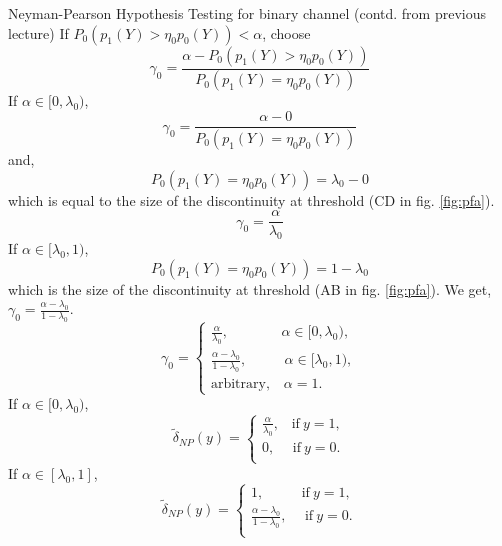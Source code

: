 \documentclass[a4paper,english,12pt]{article}
\begin{document}
\begin{exmp}{Neyman-Pearson Hypothesis Testing for binary channel (contd. from previous lecture)}
If ${P}_0(p_1(Y) > \eta_0 p_0(Y)) <\alpha$, choose  
\begin{equation}
\gamma_0 = \frac{\alpha-{P}_0(p_1(Y) > \eta_0 p_0(Y))}{{P}_0(p_1(Y) = \eta_0 p_0(Y))}
\end{equation}
If $\alpha \in [0,\lambda_0)$,
\begin{equation}
\gamma_0 = \frac{\alpha-0}{{P}_0(p_1(Y) = \eta_0 p_0(Y))}
\end{equation}
and,
\begin{equation}
{P}_0(p_1(Y) = \eta_0 p_0(Y)) = \lambda_0-0
\end{equation}
which is equal to the size of the discontinuity at threshold (CD in fig. \ref{fig:pfa}).
\begin{equation}
\gamma_0 = \frac{\alpha}{\lambda_0}
\end{equation}
If $\alpha \in [\lambda_0,1)$,
\begin{equation}
{P}_0(p_1(Y) = \eta_0 p_0(Y)) = 1-\lambda_0
\end{equation}
which is the size of the discontinuity at threshold (AB in fig. \ref{fig:pfa}). We get, $\gamma_0 = \frac{\alpha-\lambda_0}{1-\lambda_0}$.
\begin{equation}
\gamma_0=\begin{cases}
\frac{\alpha}{\lambda_0},\hspace{45pt}\alpha \in [0,\lambda_0),\\
\frac{\alpha-\lambda_0}{1-\lambda_0},\hspace{32pt}\alpha \in [\lambda_0,1),\\
\mbox{arbitrary},\hspace{10pt}\alpha = 1.
\end{cases}
\end{equation}
If $\alpha \in [0,\lambda_0)$, 
\begin{equation}
\tilde{\delta}_{NP} (y) =\begin{cases}
\frac{\alpha}{\lambda_0},\hspace{10pt}\mbox{if}~y=1,\\
0,\hspace{15pt}\mbox{if}~y=0.\\
\end{cases}
\end{equation}
If $\alpha \in [\lambda_0,1]$,
\begin{equation}
\tilde{\delta}_{NP} (y) =\begin{cases}
1,\hspace{32pt}\mbox{if}~y=1,\\
\frac{\alpha - \lambda_0}{1-\lambda_0},\hspace{15pt}\mbox{if}~y=0.\\

\end{cases}
\end{equation}
\end{exmp}
\end{document}
